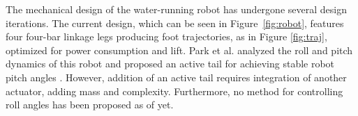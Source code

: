 The mechanical design of the water-running robot has undergone several design iterations. The current design, which can be seen in Figure~\ref{fig:robot}, features four four-bar linkage legs producing  foot trajectories, as in Figure \ref{fig:traj}, optimized for power consumption and lift. Park et al. analyzed the roll and pitch dynamics of this robot and proposed an active tail for achieving stable robot pitch angles \cite{park2010roll}. However, addition of an active tail requires integration of another actuator, adding mass and complexity. Furthermore, no method for controlling roll angles has been proposed as of yet.


